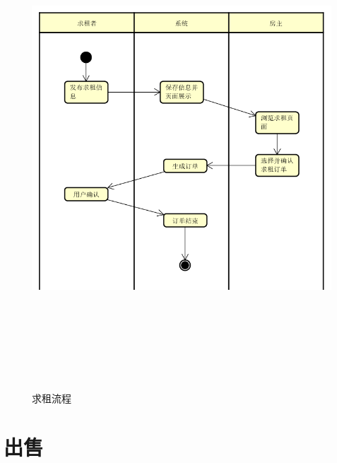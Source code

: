\begin{figure}[htbp]

    \centering
    
    \includegraphics[height=18cm,width=14.0cm]{requirement/figures/qiuzu.png}
    
    \caption{求租流程}
    
    \end{figure}
    \newpage
\section{出售}

